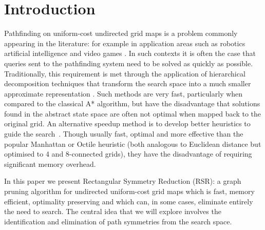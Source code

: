\section{Introduction}
\label{sec:introduction}

Pathfinding on uniform-cost undirected grid maps is a problem commonly appearing in
the literature: for example in application areas such as robotics \cite{lee09}
artificial intelligence \cite{wang09} and video games \cite{davis00,sturtevant10}.  
In such contexts it is often the
case that queries sent to the pathfinding system need to be solved as quickly as
possible.  Traditionally, this requirement is met through the application of
hierarchical decomposition techniques that transform the search space into a
much smaller approximate representation \cite{botea04,sturtevant10}.
Such methods are very fast, particularly when compared to the classical A*
algorithm, but have the disadvantage that solutions found in the abstract state
space are often not optimal when mapped back to the original grid.  An
alternative speedup method is to develop better heuristics to guide the
search~\cite{bjornsson06,sturtevant09,goldenberg10}.  Though usually
fast, optimal and more effective than the popular Manhattan or Octile heuristic (both
analogous to Euclidean distance but optimised to 4 and 8-connected grids), they
have the disadvantage of requiring significant memory overhead.
\par
In this paper we present Rectangular Symmetry Reduction (RSR): a graph pruning
algorithm for undirected uniform-cost grid maps which is fast, memory efficient,
optimality preserving and which can, in some cases, eliminate entirely the need
to search.  The central idea that we will explore involves the identification
and elimination of path symmetries from the search space. 

